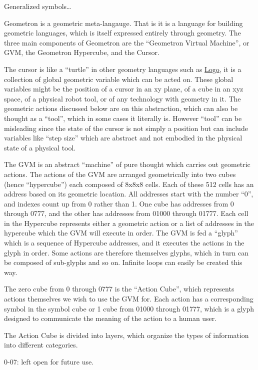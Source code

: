 Generalized symbols\ldots{}

Geometron is a geometric meta-langauge. That is it is a language for
building geometric languages, which is itself expressed entirely through
geometry. The three main components of Geometron are the ``Geometron
Virtual Machine'', or GVM, the Geometron Hypercube, and the Cursor.

The cursor is like a ``turtle'' in other geometry languages such as
\href{https://en.wikipedia.org/wiki/Logo_(programming_language)}{Logo},
it is a collection of global geometric variable which can be acted on.
These global variables might be the position of a cursor in an xy plane,
of a cube in an xyz space, of a physical robot tool, or of any
technology with geometry in it. The geometric actions discussed below
are on this abstraction, which can also be thought as a ``tool'', which
in some cases it literally is. However ``tool'' can be misleading since
the state of the cursor is not simply a position but can include
variables like ``step size'' which are abstract and not embodied in the
physical state of a physical tool.

The GVM is an abstract ``machine'' of pure thought which carries out
geometric actions. The actions of the GVM are arranged geometrically
into two cubes (hence ``hypercube'') each composed of 8x8x8 cells. Each
of these 512 cells has an address based on its geometric location. All
addresses start with the number ``0'', and indexes count up from 0
rather than 1. One cube has addresses from 0 through 0777, and the other
has addresses from 01000 through 01777. Each cell in the Hypercube
represents either a geometric action or a list of addresses in the
hypercube which the GVM will execute in order. The GVM is fed a
``glyph'' which is a sequence of Hypercube addresses, and it executes
the actions in the glyph in order. Some actions are therefore themselves
glyphs, which in turn can be composed of sub-glyphs and so on. Infinite
loops can easily be created this way.

The zero cube from 0 through 0777 is the ``Action Cube'', which
represents actions themselves we wish to use the GVM for. Each action
has a corresponding symbol in the symbol cube or 1 cube from 01000
through 01777, which is a glyph designed to communicate the meaning of
the action to a human user.

The Action Cube is divided into layers, which organize the types of
information into different categories.

0-07: left open for future use.


